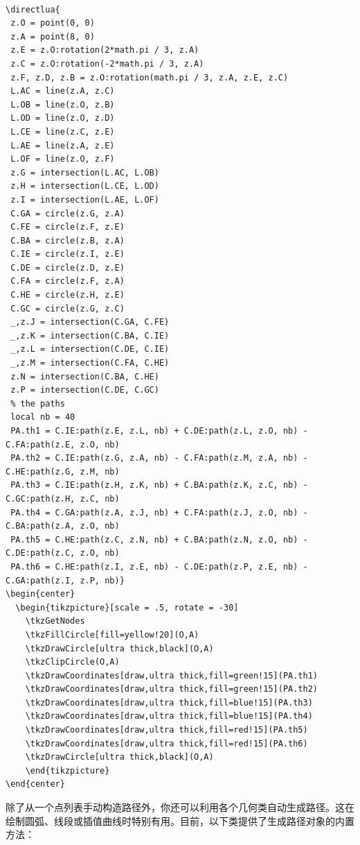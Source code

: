 \begin{verbatim}

\directlua{
 z.O = point(0, 0)
 z.A = point(8, 0)
 z.E = z.O:rotation(2*math.pi / 3, z.A)
 z.C = z.O:rotation(-2*math.pi / 3, z.A)
 z.F, z.D, z.B = z.O:rotation(math.pi / 3, z.A, z.E, z.C)
 L.AC = line(z.A, z.C)
 L.OB = line(z.O, z.B)
 L.OD = line(z.O, z.D)
 L.CE = line(z.C, z.E)
 L.AE = line(z.A, z.E)
 L.OF = line(z.O, z.F)
 z.G = intersection(L.AC, L.OB)
 z.H = intersection(L.CE, L.OD)
 z.I = intersection(L.AE, L.OF)
 C.GA = circle(z.G, z.A)
 C.FE = circle(z.F, z.E)
 C.BA = circle(z.B, z.A)
 C.IE = circle(z.I, z.E)
 C.DE = circle(z.D, z.E)
 C.FA = circle(z.F, z.A)
 C.HE = circle(z.H, z.E)
 C.GC = circle(z.G, z.C)
 _,z.J = intersection(C.GA, C.FE)
 _,z.K = intersection(C.BA, C.IE)
 _,z.L = intersection(C.DE, C.IE)
 _,z.M = intersection(C.FA, C.HE)
 z.N = intersection(C.BA, C.HE)
 z.P = intersection(C.DE, C.GC)
 % the paths
 local nb = 40
 PA.th1 = C.IE:path(z.E, z.L, nb) + C.DE:path(z.L, z.O, nb) - C.FA:path(z.E, z.O, nb)
 PA.th2 = C.IE:path(z.G, z.A, nb) - C.FA:path(z.M, z.A, nb) - C.HE:path(z.G, z.M, nb)
 PA.th3 = C.IE:path(z.H, z.K, nb) + C.BA:path(z.K, z.C, nb) - C.GC:path(z.H, z.C, nb)
 PA.th4 = C.GA:path(z.A, z.J, nb) + C.FA:path(z.J, z.O, nb) - C.BA:path(z.A, z.O, nb)
 PA.th5 = C.HE:path(z.C, z.N, nb) + C.BA:path(z.N, z.O, nb) - C.DE:path(z.C, z.O, nb)
 PA.th6 = C.HE:path(z.I, z.E, nb) - C.DE:path(z.P, z.E, nb) - C.GA:path(z.I, z.P, nb)}
\begin{center}
  \begin{tikzpicture}[scale = .5, rotate = -30]
    \tkzGetNodes
    \tkzFillCircle[fill=yellow!20](O,A)
    \tkzDrawCircle[ultra thick,black](O,A)
    \tkzClipCircle(O,A)
    \tkzDrawCoordinates[draw,ultra thick,fill=green!15](PA.th1)
    \tkzDrawCoordinates[draw,ultra thick,fill=green!15](PA.th2)
    \tkzDrawCoordinates[draw,ultra thick,fill=blue!15](PA.th3)
    \tkzDrawCoordinates[draw,ultra thick,fill=blue!15](PA.th4)
    \tkzDrawCoordinates[draw,ultra thick,fill=red!15](PA.th5)
    \tkzDrawCoordinates[draw,ultra thick,fill=red!15](PA.th6)
    \tkzDrawCircle[ultra thick,black](O,A)
    \end{tikzpicture}
\end{center}

\end{verbatim}

\medskip

除了从一个点列表手动构造路径外，你还可以利用各个几何类自动生成路径。这在绘制圆弧、线段或插值曲线时特别有用。目前，以下类提供了生成路径对象的内置方法：

